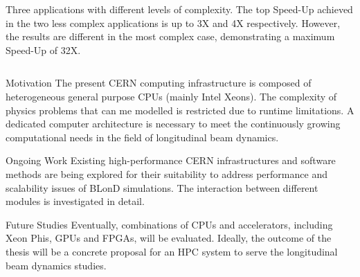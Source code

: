 \begin{frame}
\begin{block}{}
\begin{columns}[t]
		Three applications with different levels of complexity. The top Speed-Up achieved in the two less complex applications is up to 3X and 4X respectively. However, the results are different in the most complex case, demonstrating a maximum Speed-Up of 32X. 
	\end{columns}
	\end{block}
\end{frame}

\begin{frame}
	\begin{block}{Motivation}
		The present CERN computing infrastructure is composed of heterogeneous general purpose CPUs (mainly Intel Xeons). The complexity of physics problems that can me modelled is restricted due to runtime limitations. A dedicated computer architecture is necessary to meet the continuously growing computational needs in the field of longitudinal beam dynamics.
	\end{block}

	\begin{block}{Ongoing Work}
		Existing high-performance CERN infrastructures and software methods are being explored for their suitability to address performance and scalability issues of BLonD simulations. The interaction between different modules is investigated in detail.
	\end{block}

	\begin{block}{Future Studies}
		Eventually, combinations of CPUs and accelerators, including Xeon Phis, GPUs and FPGAs,  will be evaluated. Ideally, the outcome of the thesis will be a concrete proposal for an HPC system to serve the longitudinal beam dynamics studies. 
	\end{block}
\end{frame}


